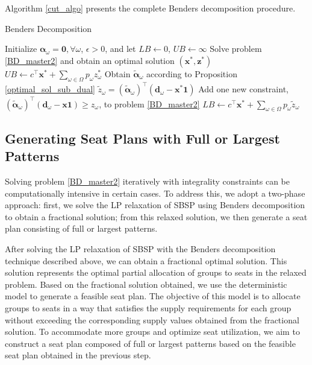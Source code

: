 




Algorithm \ref{cut_algo} presents the complete Benders decomposition procedure.

\begin{algorithm}[ht]
  \caption{Benders Decomposition}\label{cut_algo}
  Initialize $\bm{\alpha}_{\omega} = \mathbf{0}, \forall \omega$, $\epsilon >0$, and let $LB \gets 0$, $UB \gets \infty$\;
    {Solve problem \eqref{BD_master2} and obtain an optimal solution $(\mathbf{x}^{*}, \mathbf{z}^{*})$\;
    $UB \gets c^{\intercal} \mathbf{x}^{*} + \sum_{\omega \in \Omega} p_{\omega} z_{\omega}^{*}$\;
    {Obtain $\bm{\tilde{\alpha}}_{\omega}$ according to Proposition \ref{optimal_sol_sub_dual}\; $\tilde{z}_{\omega}= (\bm{\tilde{\alpha}}_{\omega})^{\intercal}(\mathbf{d}_{\omega}- \mathbf{x}^{*} \mathbf{1})$\;
    {Add one new constraint, $(\bm{\tilde{\alpha}}_{\omega})^{\intercal}(\mathbf{d}_{\omega}- \mathbf{x} \mathbf{1}) \geq z_{\omega}$, to problem \eqref{BD_master2}\;}
    }
    {$LB \gets c^{\intercal} \mathbf{x}^{*} + \sum_{\omega \in \Omega} p_{\omega} \tilde{z}_{\omega} $\;}
    }
\end{algorithm}

\subsection{Generating Seat Plans with Full or Largest Patterns}\label{seat_assignment}
Solving problem \eqref{BD_master2} iteratively with integrality constraints can be computationally intensive in certain cases. To address this, we adopt a two-phase approach: first, we solve the LP relaxation of SBSP using Benders decomposition to obtain a fractional solution; from this relaxed solution, we then generate a seat plan consisting of full or largest patterns.

After solving the LP relaxation of SBSP with the Benders decomposition technique described above, we can obtain a fractional optimal solution. This solution represents the optimal partial allocation of groups to seats in the relaxed problem. Based on the fractional solution obtained, we use the deterministic model to generate a feasible seat plan. The objective of this model is to allocate groups to seats in a way that satisfies the supply requirements for each group without exceeding the corresponding supply values obtained from the fractional solution. To accommodate more groups and optimize seat utilization, we aim to construct a seat plan composed of full or largest patterns based on the feasible seat plan obtained in the previous step.


